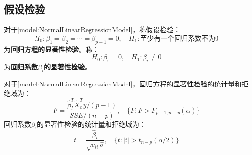 \subsection{假设检验}
\begin{definition}
	对于\cref{model:NormalLinearRegressionModel}，称假设检验：
	\begin{equation*}
		H_0:\beta_1=\beta_2=\cdots=\beta_{p-1}=0,\quad H_1:\text{至少有一个回归系数不为}0
	\end{equation*}
	为\textbf{回归方程的显著性检验}。称：
	\begin{equation*}
		H_0:\beta_i=0,\quad H_1:\beta_i\ne0
	\end{equation*}
	为\textbf{回归系数$\beta_i$的显著性检验}。
\end{definition}
\begin{theorem}
	对于\cref{model:NormalLinearRegressionModel}，回归方程的显著性检验的统计量和拒绝域为：
	\begin{equation*}
		F=\frac{\hat{\beta}_I^T\tilde{X}_c^Ty/(p-1)}{SSE/(n-p)},\quad \{F:F>F_{p-1,n-p}(\alpha)\}
	\end{equation*}
	回归系数$\beta_i$的显著性检验的统计量和拒绝域为：
	\begin{equation*}
		t=\frac{\hat{\beta}_i}{\sqrt{c_{ii}}\hat{\sigma}},\quad\{t:|t|>t_{n-p}(\alpha/2)\}
	\end{equation*}
\end{theorem}
